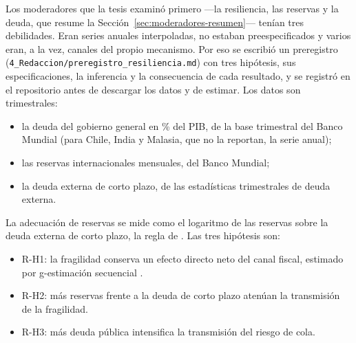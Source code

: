 Los moderadores que la tesis examinó primero ---la resiliencia, las reservas y la deuda, que resume la Sección~\ref{sec:moderadores-resumen}--- tenían tres debilidades. Eran series anuales interpoladas, no estaban preespecificados y varios eran, a la vez, canales del propio mecanismo. Por eso se escribió un preregistro (\texttt{4\_Redaccion/preregistro\_resiliencia.md}) con tres hipótesis, sus especificaciones, la inferencia y la consecuencia de cada resultado, y se registró en el repositorio antes de descargar los datos y de estimar. Los datos son trimestrales:
\begin{itemize}
    \item la deuda del gobierno general en \% del PIB, de la base trimestral del Banco Mundial (para Chile, India y Malasia, que no la reportan, la serie anual);
    \item las reservas internacionales mensuales, del Banco Mundial;
    \item la deuda externa de corto plazo, de las estadísticas trimestrales de deuda externa.
\end{itemize}
La adecuación de reservas se mide como el logaritmo de las reservas sobre la deuda externa de corto plazo, la regla de \citet{Greenspan1999}. Las tres hipótesis son:
\begin{itemize}
    \item R-H1: la fragilidad conserva un efecto directo neto del canal fiscal, estimado por g-estimación secuencial \citep{AcharyaBlackwellSen2016}.
    \item R-H2: más reservas frente a la deuda de corto plazo atenúan la transmisión de la fragilidad.
    \item R-H3: más deuda pública intensifica la transmisión del riesgo de cola.
\end{itemize}


